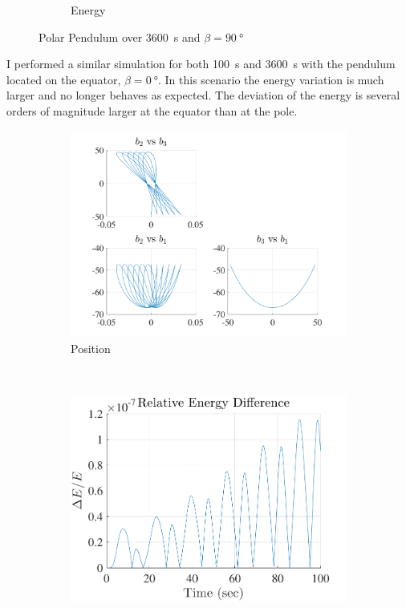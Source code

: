 \documentclass[11pt, reqno]{article}   	%
\begin{document}
\begin{figure}[htbp]
\begin{subfigure}[htbp]{0.5\textwidth}
        \caption{Energy } \label{fig:pole_energy}
    \end{subfigure}
    \caption{Polar Pendulum over \SI{3600}{s} and \( \beta = \SI{90}{\degree} \)}
    \label{fig:pole_pendulum} 
\end{figure}

I performed a similar simulation for both \SI{100}{s} and \SI{3600}{s} with the pendulum located on the equator, \( \beta = \SI{0}{\degree} \).
In this scenario the energy variation is much larger and no longer behaves as expected. 
The deviation of the energy is several orders of magnitude larger at the equator than at the pole. 
\begin{figure}[htbp] 
    \centering 
    \begin{subfigure}[htbp]{0.5\textwidth} 
        \includegraphics[width=\textwidth]{figures/eq_position_short.pdf} 
        \caption{Position } \label{fig:eq_pos_short} 
    \end{subfigure}~ %
    \begin{subfigure}[htbp]{0.5\textwidth} 
        \includegraphics[width=\textwidth]{figures/eq_energy_short.pdf} 

\end{subfigure}
\end{figure}
\end{document}

